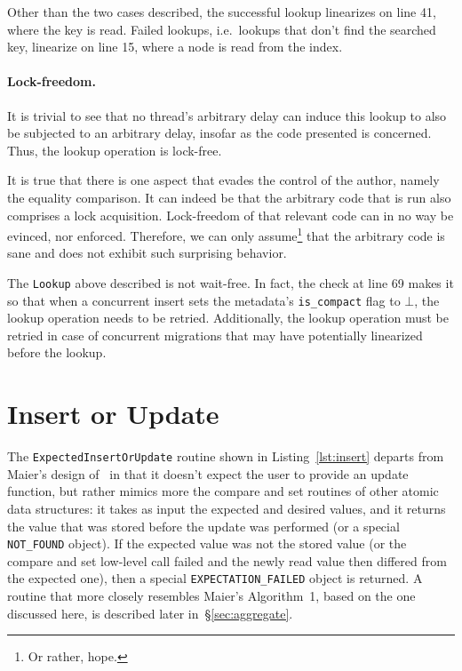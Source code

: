 Other than the two cases described, the successful lookup linearizes on line 41, where the key is read.
Failed lookups, i.e.\ lookups that don't find the searched key, linearize on line 15, where a node is read from the index.


\paragraph{Lock-freedom.}

It is trivial to see that no thread's arbitrary delay can induce this lookup to also be subjected to an arbitrary delay, insofar as the code presented is concerned.
Thus, the lookup operation is lock-free.

It is true that there is one aspect that evades the control of the author, namely the equality comparison.
It can indeed be that the arbitrary code that is run also comprises a lock acquisition.
Lock-freedom of that relevant code can in no way be evinced, nor enforced.
Therefore, we can only assume\footnote{%
	Or rather, hope.
} that the arbitrary code is sane and does not exhibit such surprising behavior.

The \texttt{Lookup} above described is not wait-free.
In fact, the check at line 69 makes it so that when a concurrent insert sets the metadata's \texttt{{is\_compact}} flag to $\bot$, the lookup operation needs to be retried.
Additionally, the lookup operation must be retried in case of concurrent migrations that may have potentially linearized before the lookup.


\section{Insert or Update}\label{sec:insert-or-update}

The \texttt{ExpectedInsertOrUpdate} routine shown in Listing~\ref{lst:insert} departs from Maier's design of~\cite[Algorithm~1]{maier} in that it doesn't expect the user to provide an update function, but rather mimics more the compare and set routines of other atomic data structures: it takes as input the expected and desired values, and it returns the value that was stored before the update was performed (or a special \texttt{{NOT\_FOUND}} object).
If the expected value was not the stored value (or the compare and set low-level call failed and the newly read value then differed from the expected one), then a special \texttt{{EXPECTATION\_FAILED}} object is returned.
A routine that more closely resembles Maier's Algorithm~1, based on the one discussed here, is described later in~\S\ref{sec:aggregate}.

